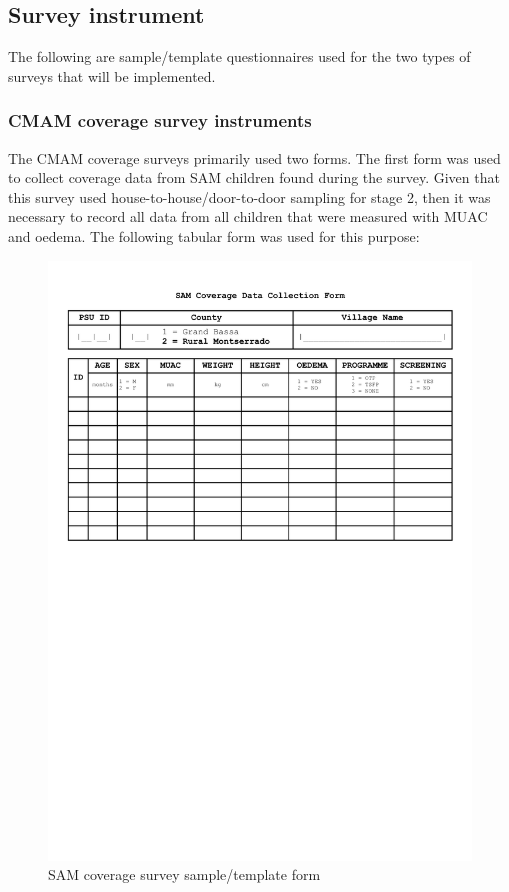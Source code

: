 \documentclass[12pt,a4paper]{article}
\theoremstyle{definition}
\theoremstyle{definition}
\theoremstyle{definition}
\theoremstyle{remark}
\begin{document}
\hypertarget{survey-instrument}{%
\subsection{Survey instrument}\label{survey-instrument}}

The following are sample/template questionnaires used for the two types
of surveys that will be implemented.

\hypertarget{cmam-coverage-survey-instruments}{%
\subsubsection{CMAM coverage survey
instruments}\label{cmam-coverage-survey-instruments}}

The CMAM coverage surveys primarily used two forms. The first form was
used to collect coverage data from SAM children found during the survey.
Given that this survey used house-to-house/door-to-door sampling for
stage 2, then it was necessary to record all data from all children that
were measured with MUAC and oedema. The following tabular form was used
for this purpose:

\newpage

\begin{figure}[H]

{\centering \includegraphics[width=0.9\linewidth]{forms/samForm} 

}

\caption{SAM coverage survey sample/template form}\label{fig:samform}
\end{figure}
\end{document}
